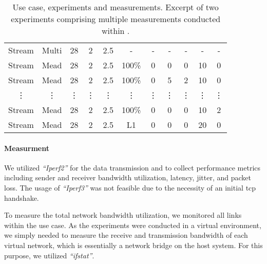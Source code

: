 \begin{table}
\begin{tabular}{@{}ccccccccccc@{}}
Stream   & Multi    & 28        & 2         & 2.5    & -      & -      & -         & -         & -               & -          \\
Stream   & Mead     & 28        & 2         & 2.5    & 100\%  & 0      & 0         & 0         & 10              & 0          \\
Stream   & Mead     & 28        & 2         & 2.5    & 100\%  & 0      & 5         & 2         & 10              & 0          \\
\vdots   & \vdots   & \vdots    & \vdots    & \vdots & \vdots & \vdots & \vdots    & \vdots    & \vdots          & \vdots \\[3pt]
Stream   & Mead     & 28        & 2         & 2.5    & 100\%  & 0      & 0         & 0         & 10              & 2          \\
Stream   & Mead     & 28        & 2         & 2.5    & L1     & 0      & 0         & 0         & 20              & 0          \\
\bottomrule
\end{tabular}
\caption[Use case, experiments and measurements]{
    Use case, experiments and measurements.
    Excerpt of two experiments comprising multiple measurements conducted
    within \nuci{}.
}
\label{tab:usecase_experiment_measurement}
\end{table}

\paragraph{Measurment} %
\label{par:Measurment}

We utilized \textit{``Iperf2''} for the data transmission and to collect
    performance metrics including sender and receiver bandwidth utilization,
    latency, jitter, and packet loss.
The usage of \textit{``Iperf3''} was not feasible due to the necessity of an
    initial \gls{tcp} handshake.

To measure the total network bandwidth utilization, we monitored all links
    within the use case.
As the experiments were conducted in a virtual environment, we simply needed to
    measure the receive and transmission bandwidth of each virtual network,
    which is essentially a network bridge on the host system.
For this purpose, we utilized \textit{``ifstat''}.

